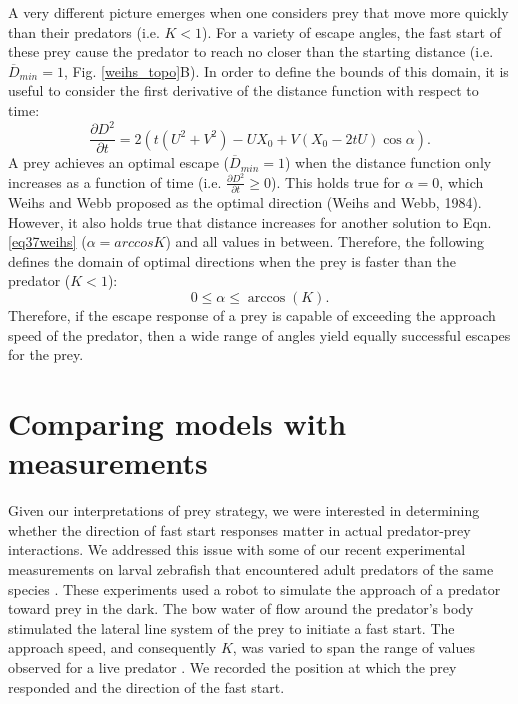 \documentclass[12pt]{article}
\def\d{\partial}
\newcommand{\ol}{\overline}
\begin{document}
A very different picture emerges when one considers prey that move more quickly than their predators (i.e. $K<1$). For a variety of escape angles, the fast start of these prey cause the predator to reach no closer than the starting distance (i.e. $\ol D_{min}=1$, Fig. \ref{weihs_topo}B). In order to define the bounds of this domain, it is useful to consider the first derivative of the distance function with respect to time:
%
\begin{equation}
\frac{\d D^2}{\d t}= 2(t(U^2+V^2) - UX_0 + V(X_0-2tU)\cos\alpha).
\label{distderivative}
\end{equation}  
%
A prey achieves an optimal escape ($\ol D_{min}=1$) when the distance function only increases as a function of time (i.e. $\frac{\d D^2}{\d t}\geq0$). This holds true for $\alpha=0$, which Weihs and Webb proposed as the optimal direction (Weihs and Webb, 1984). However, it also holds true that distance increases for another solution to Eqn. \ref{eq37weihs} ($\alpha=arccos K$) and all values in between. Therefore, the following defines the domain of optimal directions when the prey is faster than the predator ($K<1$):
%
\begin{equation}
0 \leq \alpha \leq \arccos(K).
\label{anglerange}
\end{equation}
%
Therefore, if the escape response of a prey is capable of exceeding the approach speed of the predator, then a wide range of angles yield equally successful escapes for the prey.


\section{Comparing models with measurements}

Given our interpretations of prey strategy, we were interested in determining whether the direction of fast start responses matter in actual predator-prey interactions. We addressed this issue with some of our recent experimental measurements on larval zebrafish that encountered adult predators of the same species \citep{Stewart:2014cm}. These experiments used a robot to simulate the approach of a predator toward prey in the dark. The bow water of flow around the predator's body stimulated the lateral line system of the prey to initiate a fast start. The approach speed, and consequently $K$, was varied to span the range of values observed for a live predator \citep{Stewart:2013bh}. We recorded the position at which the prey responded and the direction of the fast start. 
\end{document}

